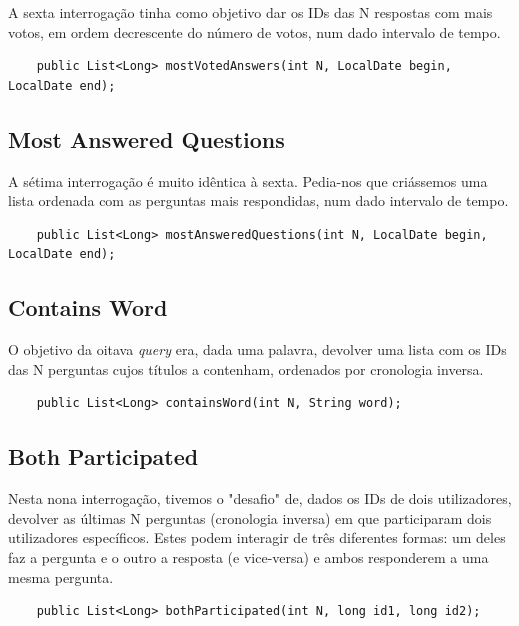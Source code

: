 \documentclass[a4paper, 11pt, oneside]{article}
\begin{document}
A sexta interrogação tinha como objetivo dar os IDs das N respostas com mais votos, em ordem decrescente do número de votos, num dado intervalo de tempo.

\begin{lstlisting}
	public List<Long> mostVotedAnswers(int N, LocalDate begin, LocalDate end);
\end{lstlisting}


\subsection{Most Answered Questions}
A sétima interrogação é muito idêntica à sexta. Pedia-nos que criássemos uma lista ordenada com as perguntas mais respondidas, num dado intervalo de tempo.

\begin{lstlisting}
	public List<Long> mostAnsweredQuestions(int N, LocalDate begin, LocalDate end);
\end{lstlisting}



\subsection{Contains Word}

O objetivo da oitava \textit{query} era, dada uma palavra, devolver uma lista com os IDs das N perguntas cujos títulos a contenham, ordenados por cronologia inversa.

\begin{lstlisting}
	public List<Long> containsWord(int N, String word);
\end{lstlisting}



\subsection{Both Participated}

Nesta nona interrogação, tivemos o "desafio" de, dados os IDs de dois utilizadores, devolver as últimas N perguntas (cronologia inversa) em que participaram dois 
utilizadores específicos. Estes podem interagir de três diferentes formas: um deles faz a pergunta e o outro a resposta (e vice-versa) e ambos responderem a uma mesma pergunta.

\begin{lstlisting}
	public List<Long> bothParticipated(int N, long id1, long id2);
\end{lstlisting}
\end{document}
